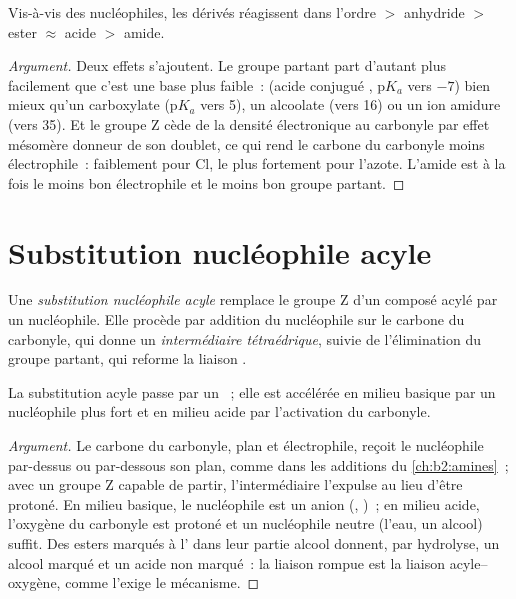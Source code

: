 \begin{proposition}\label{prop:b2:acyl-substitution:reactivity}
Vis-à-vis des nucléophiles, les dérivés réagissent dans l'ordre  $>$ anhydride $>$
ester $\approx$ acide $>$ amide.
\end{proposition}

\begin{proof}[Argument]
Deux effets s'ajoutent. Le groupe partant  part d'autant plus facilement que c'est une base
plus faible~:  (acide conjugué , $\mathrm pK_a$ vers $-7$) bien mieux qu'un
carboxylate ($\mathrm pK_a$ vers 5), un alcoolate (vers 16) ou un ion amidure (vers 35). Et le
groupe Z cède de la densité électronique au carbonyle par effet mésomère donneur de son doublet, ce
qui rend le carbone du carbonyle moins électrophile~: faiblement pour Cl, le plus fortement pour
l'azote. L'amide est à la fois le moins bon électrophile et le moins bon groupe partant.
\end{proof}

\section{Substitution nucléophile acyle}

\begin{definition}\label{def:b2:acyl-substitution:nas}
Une \emph{substitution nucléophile acyle} remplace le groupe Z
d'un composé acylé par un nucléophile. Elle procède par addition du nucléophile sur le carbone du
carbonyle, qui donne un \emph{intermédiaire tétraédrique}, suivie de
l'élimination du groupe partant, qui reforme la liaison .
\end{definition}

\begin{proposition}\label{prop:b2:acyl-substitution:addition-elimination}
La substitution acyle passe par un ~; elle est accélérée en milieu
basique par un nucléophile plus fort et en milieu acide par l'activation du carbonyle.
\end{proposition}

\begin{proof}[Argument]
Le carbone du carbonyle, plan et électrophile, reçoit le nucléophile par-dessus ou par-dessous son
plan, comme dans les additions du \cref{ch:b2:amines}~; avec un groupe Z capable de partir,
l'intermédiaire l'expulse au lieu d'être protoné. En milieu basique, le nucléophile est un anion
(, )~; en milieu acide, l'oxygène du carbonyle est protoné et un nucléophile neutre
(l'eau, un alcool) suffit. Des esters marqués à l' dans leur partie alcool donnent, par
hydrolyse, un alcool marqué et un acide non marqué~: la liaison rompue est la liaison acyle--oxygène,
comme l'exige le mécanisme.
\end{proof}

